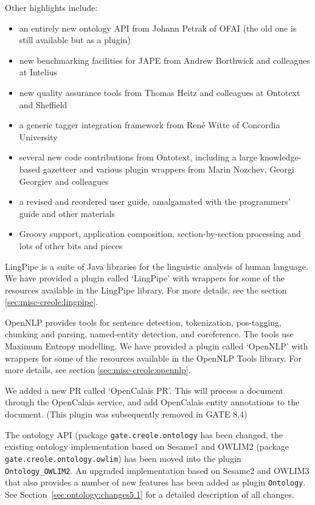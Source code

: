 Other highlights include:
\begin{itemize}
\item
an entirely new ontology API from Johann Petrak of OFAI (the old one is still
available but as a plugin)
\item
new benchmarking facilities for JAPE from Andrew Borthwick and colleagues at
Intelius
\item
new quality assurance tools from Thomas Heitz and colleagues at Ontotext and
Sheffield 
\item
a generic tagger integration framework from Ren\'e Witte of Concordia University
\item
several new code contributions from Ontotext, including a large
knowledge-based gazetteer and various plugin wrappers from Marin Nozchev,
Georgi Georgiev and colleagues
\item
a revised and reordered user guide, amalgamated with the programmers' guide
and other materials
\item
Groovy support, application composition, section-by-section processing and
lots of other bits and pieces
\end{itemize}



LingPipe is a suite of Java libraries for the linguistic analysis of human
language.  We have provided a plugin called `LingPipe' with wrappers for some 
of the resources available in the LingPipe library. For more details, see the 
section \ref{sec:misc-creole:lingpipe}.


OpenNLP provides tools for sentence detection, tokenization, pos-tagging,
chunking and parsing, named-entity detection, and coreference. The tools use
Maximum Entropy modelling. We have provided a plugin called `OpenNLP' with
wrappers for some of the resources available in the OpenNLP Tools library. For
more details, see section \ref{sec:misc-creole:opennlp}.


We added a new PR called `OpenCalais PR'. This will process a document
through the OpenCalais service, and add OpenCalais entity annotations to the
document. (This plugin was subsequently removed in GATE 8.4)


The ontology API (package \verb!gate.creole.ontology! has been changed, the 
existing ontology implementation based on Sesame1 and OWLIM2 
(package \verb!gate.creole.ontology.owlim!) has been moved into 
the plugin \verb!Ontology_OWLIM2!. An upgraded implementation 
based on Sesame2 and OWLIM3 that also provides a number of new 
features has been added as plugin \verb!Ontology!. 
See Section~\ref{sec:ontology:changes5.1} for a detailed description of
all changes.

